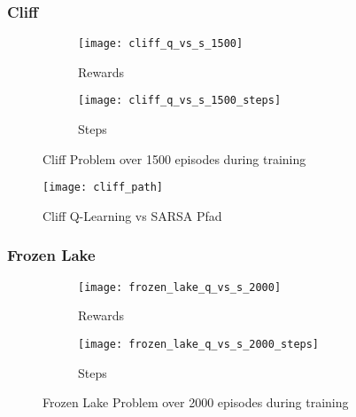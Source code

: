 \subsubsection{Cliff}
\begin{figure}
    \centering
    \begin{subfigure}{.5\textwidth}
      \centering
      \texttt{[image: cliff\_q\_vs\_s\_1500]}
      \caption{Rewards}
      \label{fig:cliff_rew}
    \end{subfigure}%
    \begin{subfigure}{.5\textwidth}
      \centering
      \texttt{[image: cliff\_q\_vs\_s\_1500\_steps]}
      \caption{Steps}
      \label{fig:cliff_step}
    \end{subfigure}
    \caption{Cliff Problem over 1500 episodes during training}
    \label{fig:cliff_train}
\end{figure}

\begin{figure}
    \texttt{[image: cliff\_path]}
    \caption{Cliff Q-Learning vs SARSA Pfad}
    \label{fig:cliff_path}
\end{figure}

\subsubsection{Frozen Lake}

\begin{figure}
    \centering
    \begin{subfigure}{.5\textwidth}
      \centering
      \texttt{[image: frozen\_lake\_q\_vs\_s\_2000]}
      \caption{Rewards}
      \label{fig:frozen_rew}
    \end{subfigure}%
    \begin{subfigure}{.5\textwidth}
      \centering
      \texttt{[image: frozen\_lake\_q\_vs\_s\_2000\_steps]}
      \caption{Steps}
      \label{fig:frozen_step}
    \end{subfigure}
    \caption{Frozen Lake Problem over 2000 episodes during training}
    \label{fig:frozen_train}
\end{figure}


